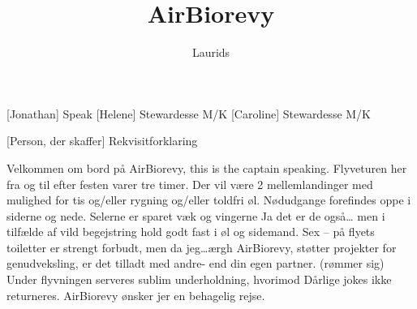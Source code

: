 \documentclass[a4paper,11pt]{article}
\title{AirBiorevy}
\author{Laurids}
\begin{document}
\maketitle

\begin{roles}
	[Jonathan] Speak
	[Helene] Stewardesse M/K
	[Caroline] Stewardesse M/K
\end{roles}

\begin{props}
    [Person, der skaffer] Rekvisitforklaring
\end{props}


\begin{sketch}


\begin{center}

\end{center}


 \newline
Velkommen om bord på AirBiorevy, this is the captain speaking. \newline
Flyveturen her fra og til efter festen \newline
varer tre timer. \newline
Der vil være 2 mellemlandinger med mulighed for tis \newline
og/eller rygning \newline
og/eller toldfri øl. \newline
Nødudgange forefindes oppe \newline
i siderne\newline
og nede.\newline
Selerne\newline
er sparet væk\newline
og vingerne\newline
Ja det er de også\ldots \newline
men i tilfælde af vild begejstring \newline
hold godt fast i øl \newline
og sidemand. \newline
Sex -- på flyets toiletter \newline
er strengt forbudt, \newline
men da jeg\ldots ærgh AirBiorevy, støtter projekter for genudveksling, er det tilladt med andre- end din egen partner. \newline
(rømmer sig) Under flyvningen serveres sublim underholdning, \newline
hvorimod Dårlige jokes ikke returneres. \newline
AirBiorevy ønsker jer en behagelig rejse. \newline


\end{sketch}
\end{document}
